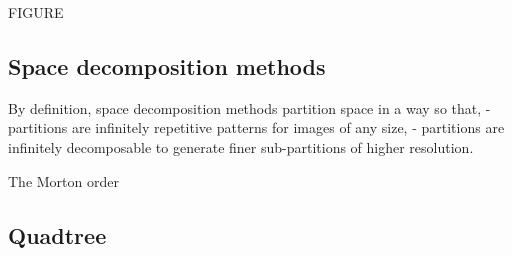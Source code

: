 FIGURE

\subsection{Space decomposition methods}

By definition, space decomposition methods partition space in a way so that,
- partitions are infinitely repetitive patterns for images of any size,
- partitions are infinitely decomposable to generate finer sub-partitions of higher resolution.\cite{Samet90spatialdata}

The Morton order

\subsection{Quadtree}






